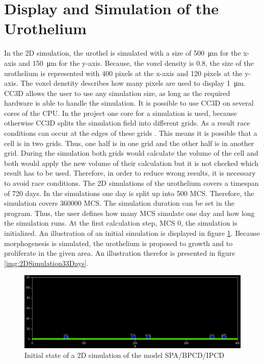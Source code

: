 \section{Display and Simulation of the Urothelium}
In the 2D simulation, the urothel is simulated with a size of \SI{500}{\micro\metre} for the x-axis and \SI{150}{\micro\metre} for the y-axis. Because, the voxel density is $0.8$, the size of the urothelium is represented with 400 pixels at the x-axis and 120 pixels at the y-axis. The voxel denstity describes how many pixels are used to display \SI{1}{\micro\metre}. \ac{CC3D} allows the user to use any simulation size, as long as the required hardware is able to handle the simulation. \newline
It is possible to use \ac{CC3D} on several cores of the \ac{CPU}. In the project one core for a simulation is used, because otherwise \ac{CC3D} splits the simulation field into different grids. As a result race conditions can occur at the edges of these grids \cite{MaciejH.Swat2017}. This means it is possible that a cell is in two grids. Thus, one half is in one grid and the other half is in another grid. During the simulation both grids would calculate the volume of the cell and both would apply the new volume of their calculation but it is not checked which result has to be used. Therefore, in order to reduce wrong results, it is necessary to avoid race conditions. \newline 
The 2D simulations of the urothelium covers a timespan of 720 days. In the simulations one day is split up into 500 \ac{MCS}. Therefore, the simulation covers 360000 \ac{MCS}. The simulation duration can be set in the program. Thus, the user defines how many \ac{MCS} simulate one day and how long the simulation runs. At the first calculation step, \ac{MCS} 0, the simulation is initialized. An illustration of an initial simulation is displayed in figure \ref{img:2DSimulationInitialState}. Because morphogenesis is simulated, the urothelium is proposed to growth and to proliferate in the given area. An illustration therefor is presented in figure \ref{img:2DSimulation33Days}.

\begin{figure}[ht]
	\center
	\includegraphics[scale=0.35]{figures/2DSimulation-InitialState.png}
	\caption{Initial state of a 2D simulation of the model SPA/BPCD/IPCD}
	\label{img:2DSimulationInitialState}
\end{figure}

